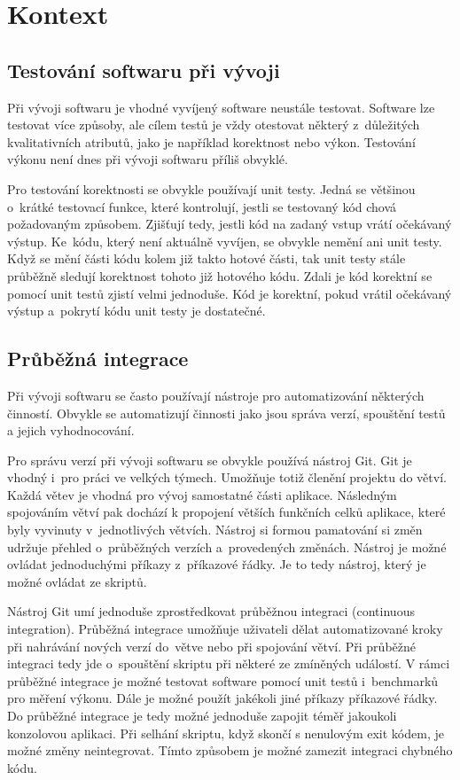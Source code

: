 \chapter{Kontext}

\section{Testování softwaru při vývoji}
Při vývoji softwaru je vhodné vyvíjený software neustále testovat. Software lze testovat
více způsoby, ale cílem testů je vždy otestovat některý z~důležitých kvalitativních
atributů, jako je například korektnost nebo výkon. Testování výkonu není dnes při vývoji softwaru příliš obvyklé. \cite[]{unitTestingPerformanceSurvey}

Pro testování korektnosti se obvykle používají unit testy. Jedná se většinou o~krátké testovací
funkce, které kontrolují, jestli se testovaný kód chová požadovaným způsobem. Zjišťují tedy, jestli
kód na zadaný vstup vrátí očekávaný výstup. Ke~kódu, který není aktuálně vyvíjen, se obvykle nemění
ani unit testy. Když se mění části kódu kolem již takto hotové části, tak unit testy stále průběžně sledují
korektnost tohoto již hotového kódu. Zdali je kód korektní se pomocí unit testů zjistí velmi jednoduše.
Kód je korektní, pokud vrátil očekávaný výstup a~pokrytí kódu unit testy je dostatečné.

\section{Průběžná integrace}
Při vývoji softwaru se často používají nástroje pro automatizování některých činností.
Obvykle se automatizují činnosti jako jsou správa verzí, spouštění testů a jejich vyhodnocování.

Pro správu verzí při vývoji softwaru se obvykle používá nástroj Git.
Git je vhodný i~pro práci ve velkých týmech.
Umožňuje totiž členění projektu do větví. Každá větev je vhodná pro vývoj samostatné části aplikace.
Následným spojováním větví pak dochází k propojení větších funkčních celků aplikace, které byly vyvinuty v~jednotlivých větvích.
Nástroj si formou pamatování si změn udržuje přehled o~průběžných verzích a~provedených změnách.
Nástroj je možné ovládat jednoduchými příkazy z~příkazové řádky.
Je to tedy nástroj, který je možné ovládat ze skriptů.

Nástroj Git umí jednoduše zprostředkovat průběžnou integraci (continuous integration). Průběžná integrace umožňuje uživateli dělat automatizované
kroky při nahrávání nových verzí do~větve nebo při spojování větví. Při průběžné integraci tedy jde o~spouštění
skriptu při některé ze zmíněných událostí. V rámci průběžné integrace je možné testovat software pomocí unit testů
i~benchmarků pro měření výkonu. Dále je možné použít jakékoli jiné příkazy příkazové řádky.
Do průběžné integrace je tedy možné jednoduše zapojit téměř jakoukoli konzolovou aplikaci.
Při selhání skriptu, když skončí s nenulovým exit kódem, je možné změny neintegrovat.
Tímto způsobem je možné zamezit integraci chybného kódu.

